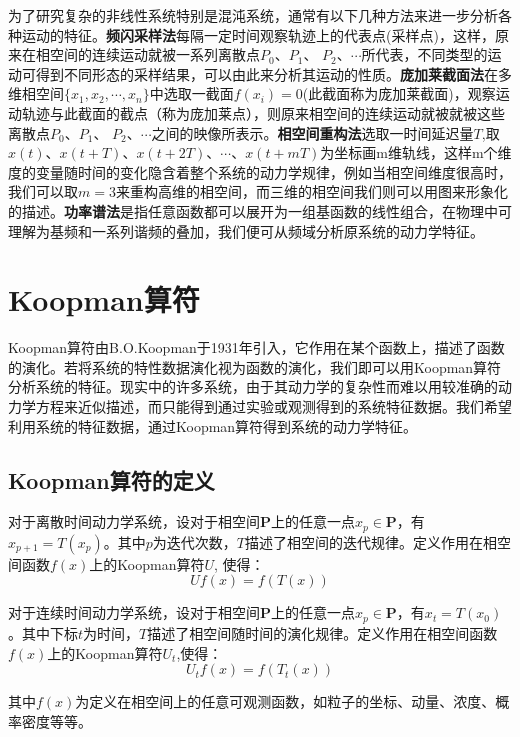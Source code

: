 为了研究复杂的非线性系统特别是混沌系统，通常有以下几种方法来进一步分析各种运动的特征。\textbf{频闪采样法}每隔一定时间观察轨迹上的代表点(采样点)，这样，原来在相空间的连续运动就被一系列离散点$P_0$、$P_1$、
$P_2$、$\cdots$所代表，不同类型的运动可得到不同形态的采样结果，可以由此来分析其运动的性质。\textbf{庞加莱截面法}在多维相空间$\{x_1,x_2,\cdots,x_n\}$中选取一截面$f(x_i)=0$(此截面称为庞加莱截面)，观察运动轨迹与此截面的截点（称为庞加莱点），则原来相空间的连续运动就被就被这些离散点$P_0$、$P_1$、
$P_2$、$\cdots$之间的映像所表示。\textbf{相空间重构法}选取一时间延迟量$T$,取$x(t)$、$x(t+T)$、$x(t+2T)$、$\cdots$、$x(t+mT)$为坐标画m维轨线，这样m个维度的变量随时间的变化隐含着整个系统的动力学规律，例如当相空间维度很高时，我们可以取$m=3$来重构高维的相空间，而三维的相空间我们则可以用图来形象化的描述。\textbf{功率谱法}是指任意函数都可以展开为一组基函数的线性组合，在物理中可理解为基频和一系列谐频的叠加，我们便可从频域分析原系统的动力学特征。



\section{Koopman算符}
Koopman算符由B.O.Koopman于1931年引入，它作用在某个函数上，描述了函数的演化。若将系统的特性数据演化视为函数的演化，我们即可以用Koopman算符分析系统的特征。现实中的许多系统，由于其动力学的复杂性而难以用较准确的动力学方程来近似描述，而只能得到通过实验或观测得到的系统特征数据。我们希望利用系统的特征数据，通过Koopman算符得到系统的动力学特征。

\subsection{Koopman算符的定义}
对于离散时间动力学系统，设对于相空间$\mathbf{P}$上的任意一点$x_p\in \mathbf{P}$，有$x_{p+1}=T(x_p)$。其中$p$为迭代次数，$T$描述了相空间的迭代规律。定义作用在相空间函数$f(x)$上的Koopman算符$U$, 使得：
\begin{equation}
    Uf(x)=f(T(x))
\end{equation}

对于连续时间动力学系统，设对于相空间$\mathbf{P}$上的任意一点$x_p\in \mathbf{P}$，有$x_t=T(x_0)$。其中下标$t$为时间，$T$描述了相空间随时间的演化规律。定义作用在相空间函数$f(x)$上的Koopman算符$U_t$,使得：
\begin{equation}
    U_tf(x)=f(T_t(x))
\end{equation} 

其中$f(x)$为定义在相空间上的任意可观测函数，如粒子的坐标、动量、浓度、概率密度等等。

